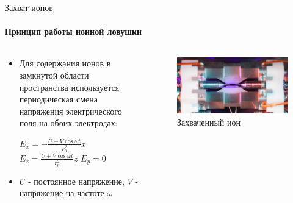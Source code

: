 \documentclass{beamer}
\begin{document}
	\begin{frame}{Захват ионов}
		\framesubtitle{Принцип работы ионной ловушки}
		
		\begin{columns}
			
			\begin{column}{0.5\textwidth}
				
				\begin{itemize}
					\item<2-> Для содержания ионов в замкнутой области пространства используется
					периодическая смена напряжения электрического поля на обоих электродах:

					$E_x = - \frac{U + V \cos{\omega t}}{r_{0}^2} x$
					$E_z = \frac{U + V \cos{\omega t}}{r_{0}^2} z$
					$E_y = 0$

					\item<2-> $U$ - постоянное напряжение, $V$ - напряжение на частоте $\omega$
				\end{itemize}
				
			\end{column}
			
			\begin{column}{0.5\textwidth}
				\begin{figure}
					\centering
					\includegraphics[width=\textwidth]{media/trapped-ion.jpg}
					\caption{Захваченный ион}
				\end{figure}
			\end{column}
			
		\end{columns}
	\end{frame}
	
	
	
\end{document}
